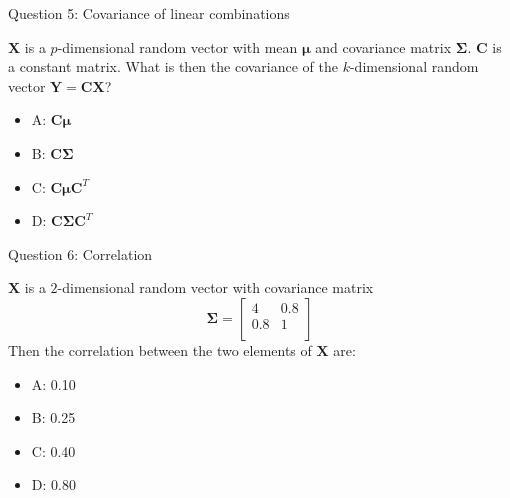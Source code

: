 \documentclass[ignorenonframetext,]{beamer}
\providecommand{\tightlist}{%
  \setlength{\itemsep}{0pt}\setlength{\parskip}{0pt}}
\begin{document}
\begin{frame}

\begin{block}{Question 5: Covariance of linear combinations}

\vspace{2mm}

\(\mathbf{X}\) is a \(p\)-dimensional random vector with mean
\(\mathbf{\mu}\) and covariance matrix \(\mathbf\Sigma\). \(\mathbf{C}\)
is a constant matrix. What is then the covariance of the
\(k\)-dimensional random vector \(\mathbf{Y}=\mathbf{C}\mathbf{X}\)?

\begin{itemize}
\tightlist
\item
  A: \(\mathbf{C}\mathbf{\mu}\)
\item
  B: \(\mathbf{C}\mathbf\Sigma\)
\item
  C: \(\mathbf{C}\mathbf{\mu}\mathbf{C}^T\)
\item
  D: \(\mathbf{C}\mathbf\Sigma\mathbf{C}^T\)
\end{itemize}

\end{block}

\end{frame}

\begin{frame}

\begin{block}{Question 6: Correlation}

\vspace{2mm}

\(\mathbf{X}\) is a \(2\)-dimensional random vector with covariance
matrix \[ \mathbf\Sigma= \left[\begin{array}{cc}
          4 & 0.8 \\
          0.8 & 1\\
      \end{array}
    \right]\] Then the correlation between the two elements of
\(\mathbf{X}\) are:

\begin{itemize}
\tightlist
\item
  A: 0.10
\item
  B: 0.25
\item
  C: 0.40
\item
  D: 0.80
\end{itemize}

\end{block}

\end{frame}
\end{document}
